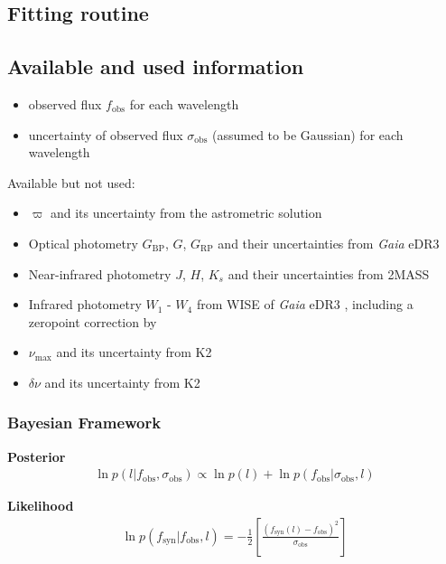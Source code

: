 \documentclass[
  journal=pasa,
  manuscript=research-paper, %
  year=2021,
  volume=37,
]{cup-journal}
\newcommand{\numax}{$\nu_\mathrm{max}$\xspace}
\newcommand{\Gaia}{\textit{Gaia}\xspace}
\begin{document}
\subsection{Fitting routine}

\subsection{Available and used information}

\begin{itemize}
    \item observed flux $f_\text{obs}$ for each wavelength
    \item uncertainty of observed flux $\sigma_\text{obs}$ (assumed to be Gaussian) for each wavelength
\end{itemize}

Available but not used:
\begin{itemize}
    \item $\varpi$ and its uncertainty from the astrometric solution
    \item Optical photometry $G_\text{BP}$, $G$, $G_\text{RP}$ and their uncertainties from \Gaia eDR3 \citep{Brown2021}
    \item Near-infrared photometry $J$, $H$, $K_s$ and their uncertainties from 2MASS \citep{Skrutskie2006}
    \item Infrared photometry $W_1$ - $W_4$ from WISE \citep{Cutri2013}
    \citep{Lindegren2021a} of \Gaia eDR3 \citep{Brown2021}, including a zeropoint correction by \citet{Lindegren2021b}
    \item \numax and its uncertainty from K2 \citep[][in prep.]{Zinn2020}
    \item $\delta \nu$ and its uncertainty from K2 \citep[][in prep.]{Zinn2020}
\end{itemize}

\subsubsection{Bayesian Framework}

\textbf{Posterior}
\begin{align}
    \ln p (l \vert f_\text{obs}, \sigma_\text{obs})
    \propto
    \ln p (l) + \ln p (f_\text{obs} \vert \sigma_\text{obs}, l)
\end{align}

\textbf{Likelihood}
\begin{align}
    \ln p \left( f_\text{syn} \vert f_\text{obs}, l \right) = - \frac{1}{2} \left[ \frac{\left(f_\text{syn}(l) - f_\text{obs} \right)^2}{\sigma_\text{obs}} \right]
\end{align}
\end{document}
